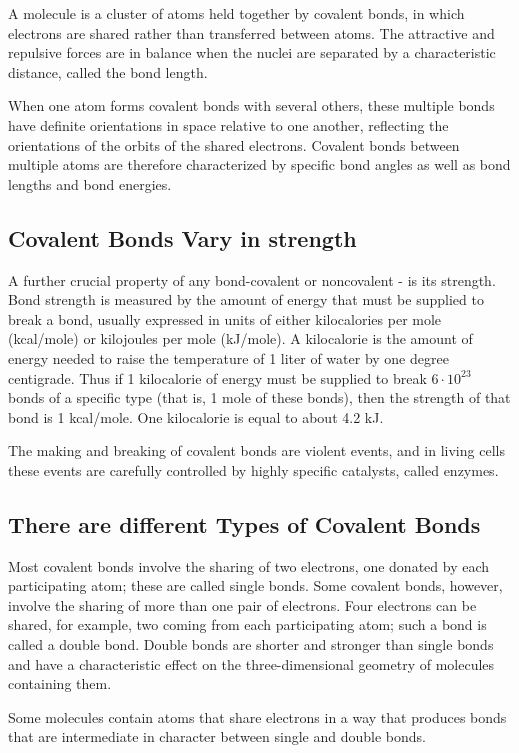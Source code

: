 A molecule is a cluster of atoms held together by covalent bonds, in which
electrons are shared rather than transferred between atoms.
The attractive and repulsive forces are in balance when the nuclei are separated
by a characteristic distance, called the bond length.

When one atom forms covalent bonds with several others, these multiple
bonds have definite orientations in space relative to one another, reflecting
the orientations of the orbits of the shared electrons. Covalent bonds
between multiple atoms are therefore characterized by specific bond
angles as well as bond lengths and bond energies.

\subsection{Covalent Bonds Vary in strength}

A further crucial property of any bond-covalent or noncovalent - is its strength. Bond
strength is measured by the amount of energy that must be supplied to
break a bond, usually expressed in units of either kilocalories per mole
(kcal/mole) or kilojoules per mole (kJ/mole). A kilocalorie is the amount
of energy needed to raise the temperature of 1 liter of water by one degree centigrade. Thus
if 1 kilocalorie of energy must be supplied to break $6 \cdot 10^{23}$ bonds of a
specific type (that is, 1 mole of these bonds), then the strength of that
bond is 1 kcal/mole. One kilocalorie is equal to about 4.2 kJ.

The making and breaking of covalent bonds are violent events, and in living
cells these events are carefully controlled by highly specific catalysts,
called enzymes.

\subsection{There are different Types of Covalent Bonds}

Most covalent bonds involve the sharing of two electrons, one donated
by each participating atom; these are called single bonds. Some covalent
bonds, however, involve the sharing of more than one pair of electrons.
Four electrons can be shared, for example, two coming from each participating
atom; such a bond is called a double bond. Double bonds are
shorter and stronger than single bonds and have a characteristic effect
on the three-dimensional geometry of molecules containing them.

Some molecules contain atoms that share electrons in a way that produces
bonds that are intermediate in character between single and double
bonds.

